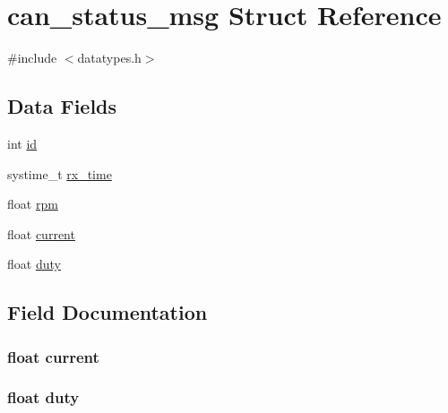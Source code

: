 \hypertarget{structcan__status__msg}{}\section{can\+\_\+status\+\_\+msg Struct Reference}
\label{structcan__status__msg}


{\ttfamily \#include $<$datatypes.\+h$>$}

\subsection*{Data Fields}
\begin{DoxyCompactItemize}
\item 
int \hyperlink{structcan__status__msg_a7441ef0865bcb3db9b8064dd7375c1ea}{id}
\item 
systime\+\_\+t \hyperlink{structcan__status__msg_a2cbed3b3239da5fee2814530c2815fdb}{rx\+\_\+time}
\item 
float \hyperlink{structcan__status__msg_a25e39b399c2a11f0d76e42ab8241a910}{rpm}
\item 
float \hyperlink{structcan__status__msg_af9653d31acfffa5a40aa709b2065e00b}{current}
\item 
float \hyperlink{structcan__status__msg_a70f44948d7630be99b15ecac985a502f}{duty}
\end{DoxyCompactItemize}


\subsection{Field Documentation}
\hypertarget{structcan__status__msg_af9653d31acfffa5a40aa709b2065e00b}{}
\subsubsection[{current}]{\setlength{\rightskip}{0pt plus 5cm}float current}\label{structcan__status__msg_af9653d31acfffa5a40aa709b2065e00b}
\hypertarget{structcan__status__msg_a70f44948d7630be99b15ecac985a502f}{}
\subsubsection[{duty}]{\setlength{\rightskip}{0pt plus 5cm}float duty}\label{structcan__status__msg_a70f44948d7630be99b15ecac985a502f}
\hypertarget{structcan__status__msg_a7441ef0865bcb3db9b8064dd7375c1ea}{}
